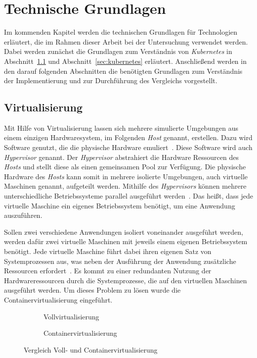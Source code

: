\chapter{Technische Grundlagen}\label{ch:technical-basics}

Im kommenden Kapitel werden die technischen Grundlagen für Technologien erläutert, die im Rahmen dieser Arbeit
bei der Untersuchung verwendet werden. Dabei werden zunächst die Grundlagen zum Verständnis von \textit{Kubernetes}
in Abschnitt~\ref{sec:virtualization} und Abschnitt~\ref{sec:kubernetes} erläutert. Anschließend werden in den
darauf folgenden Abschnitten die benötigten Grundlagen zum Verständnis der Implementierung und zur Durchführung des Vergleichs
vorgestellt.

\section{Virtualisierung}\label{sec:virtualization}

Mit Hilfe von Virtualisierung lassen sich mehrere simulierte Umgebungen aus einem einzigen Hardwaresystem, im Folgenden \textit{Host} genannt, erstellen.
Dazu wird Software genutzt, die die physische Hardware emuliert~\cite{virtualization-techtarget}. Diese Software wird auch \textit{Hypervisor} genannt.
Der \textit{Hypervisor} abstrahiert die Hardware Ressourcen des \textit{Hosts} und stellt diese als einen gemeinsamen Pool zur Verfügung.
Die physische Hardware des \textit{Hosts} kann somit in mehrere isolierte Umgebungen, auch virtuelle Maschinen genannt, aufgeteilt werden.
Mithilfe des \textit{Hypervisors} können mehrere unterschiedliche Betriebssysteme parallel ausgeführt werden~\cite{virtualization-red-hat, hypervisor-red-hat}.
Das heißt, dass jede virtuelle Maschine ein eigenes Betriebssystem benötigt, um eine Anwendung auszuführen.

Sollen zwei verschiedene Anwendungen isoliert voneinander ausgeführt werden, werden dafür zwei virtuelle Maschinen mit jeweils einem eigenen Betriebssystem benötigt.
Jede virtuelle Maschine führt dabei ihren eigenen Satz von Systemprozessen aus, was neben der Ausführung der Anwendung zusätzliche Ressourcen erfordert~\cite{kubernetes-in-action-introduction}.
Es kommt zu einer redundanten Nutzung der Hardwareressourcen durch die Systemprozesse, die auf den virtuellen Maschinen ausgeführt werden.
Um dieses Problem zu lösen wurde die Containervirtualisierung eingeführt.

\begin{figure}
    \centering
    \begin{subfigure}{.5\textwidth}
        \centering
        
        \caption{Vollvirtualisierung}
        \label{fig:full-virtualization}
    \end{subfigure}%
    \begin{subfigure}{.5\textwidth}
        \centering
        
        \caption{Containervirtualisierung}
        \label{fig:container-virtualization}
    \end{subfigure}
    \caption{Vergleich Voll- und Containervirtualisierung}
    \label{fig:virtualization-comparison}
\end{figure}

